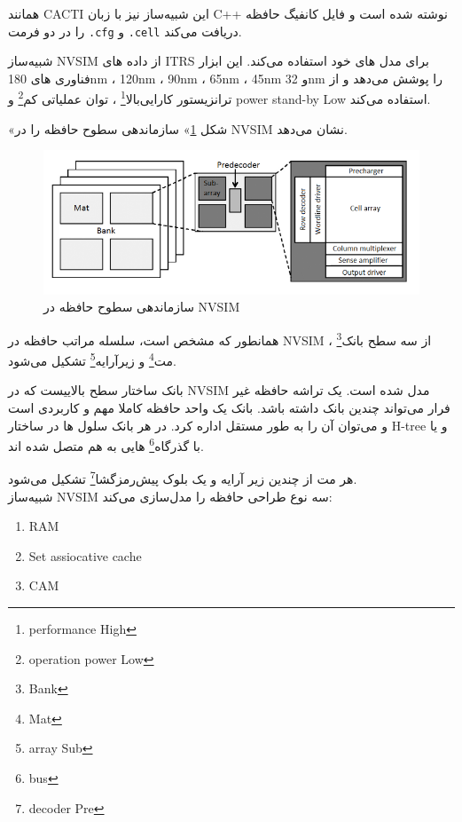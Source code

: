 \documentclass[12pt]{exam}
\begin{document}
\begin{questions}
همانند CACTI این شبیه‌ساز نیز با زبان C++ نوشته شده است و فایل کانفیگ حافظه را در دو فرمت \texttt{.cfg} و \texttt{.cell} دریافت می‌کند.

شبیه‌ساز NVSIM از داده های ITRS برای مدل های خود استفاده می‌کند. این ابزار فناوری های 180nm ، 120nm ، 90nm ،  65nm ، 45nm و 32nm را پوشش می‌دهد و از ترانزیستور کارایی‌بالا\footnote{performance High} ، توان عملیاتی کم\footnote{operation power Low} و power stand-by Low استفاده می‌کند.

«شکل \textcolor{blue}{\ref{سازماندهی سطوح حافظه در NVSIM}}» سازماندهی سطوح حافظه را در NVSIM نشان می‌دهد.

\begin{figure}[h]
	\centering
	\includegraphics[width=1\textwidth]{images/img10}
	\caption{سازماندهی سطوح حافظه در NVSIM}
	\label{سازماندهی سطوح حافظه در NVSIM}
\end{figure}

همانطور که مشخص است،‌ سلسله مراتب حافظه در NVSIM از سه سطح بانک\footnote{Bank} ، مت\footnote{Mat} و زیرآرایه\footnote{array Sub} تشکیل می‌شود.

بانک ساختار سطح بالاییست که در NVSIM مدل شده است. یک تراشه حافظه غیر فرار می‌تواند چندین بانک داشته باشد. بانک یک واحد حافظه کاملا مهم و کاربردی است و می‌توان آن را به طور مستقل اداره کرد. در هر بانک سلول ها در ساختار H-tree و یا با گذرگاه\footnote{bus} هایی به هم متصل شده اند.

هر مت از چندین زیر آرایه و یک بلوک پیش‌رمزگشا\footnote{decoder Pre} تشکیل می‌شود.\\

شبیه‌ساز NVSIM سه نوع طراحی حافظه را مدل‌سازی می‌کند:
\begin{latin}
	\begin{enumerate}
		\item RAM
		\item Set assiocative cache
		\item CAM
	\end{enumerate}
\end{latin}









\end{questions}
\end{document}
